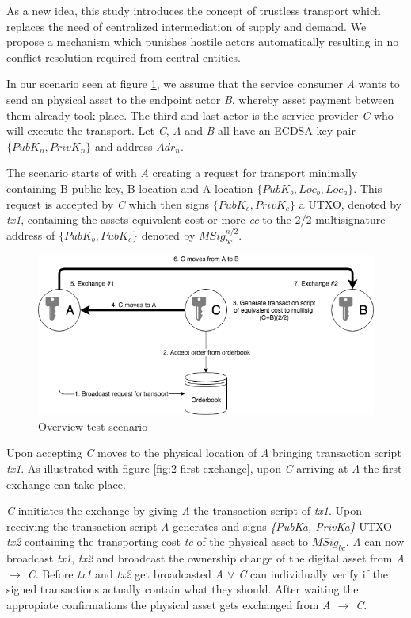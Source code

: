 As a new idea, this study introduces the concept of trustless transport which replaces the need of centralized intermediation of supply and demand. We propose a mechanism which punishes hostile actors automatically resulting in no conflict resolution required from central entities. \par
In our scenario seen at figure \ref{fig:1 main overview}, we assume that the service consumer \textit{A} wants to send an physical asset to the endpoint actor \textit{B}, whereby asset payment between them already took place. The third and last actor is the service provider \textit{C} who will execute the transport. Let \textit{C}, \textit{A} and \textit{B} all have an ECDSA key pair \(\{PubK_n, PrivK_n\}\) and address \(Adr_n\). \par
The scenario starts of with \textit{A} creating a request for transport minimally containing B public key, B location and A location \(\{PubK_b, Loc_b, Loc_a\}\). This request is accepted by \textit{C} which then signs \(\{PubK_c, PrivK_c\}\) a UTXO, denoted by \textit{tx1}, containing the assets equivalent cost or more \textit{ec} to the 2/2 multisignature address of \(\{PubK_b, PubK_c\}\) denoted by \(MSig_{bc}^{n/2}\). \par

\begin{figure}[h]
\centering
\includegraphics[width=1\textwidth]{images/main.png}
\caption{Overview test scenario}
\label{fig:1 main overview}
\end{figure}

Upon accepting \textit{C} moves to the physical location of \textit{A} bringing transaction script \textit{tx1}. As illustrated with figure \ref{fig:2 first exchange}, upon \textit{C} arriving at \textit{A} the first exchange can take place. \par
\textit{C} innitiates the exchange by giving \textit{A} the transaction script of \textit{tx1}. Upon receiving the transaction script \textit{A} generates and signs \textit{\{PubKa, PrivKa\}} UTXO \textit{tx2} containing the transporting cost \textit{tc} of the physical asset to \(MSig_{bc}\). \textit{A} can now broadcast \textit{tx1}, \textit{tx2} and broadcast the ownership change of the digital asset from \textit{A $\rightarrow$ C}. Before \textit{tx1} and \textit{tx2} get broadcasted \textit{A $\lor$ C} can individually verify if the signed transactions actually contain what they should. After waiting the appropiate confirmations the physical asset gets exchanged from \textit{A $\rightarrow$ C}.

